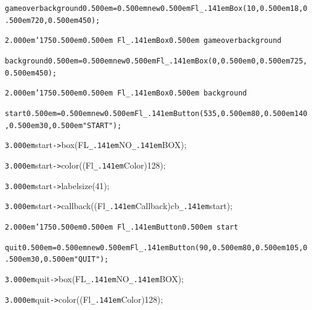 \documentclass[12pt]{article}
\begin{document}
\noindent
\tt{}gameoverbackground{\tt\mc \kern0.500em}={\tt\mc \kern0.500em}new{\tt\mc \kern0.500em}Fl{\tt\_\kern.141em}Box(10,{\tt\mc \kern0.500em}18,{\tt\mc \kern0.500em}720,{\tt\mc \kern0.500em}450);

\noindent
{}{\tt\mc \kern2.000em}{\tt\char'175}{\tt\mc \kern0.500em}\tt\mc {\tt /}{\tt /}\kern0.500em Fl{\tt\_\kern.141em}Box{\tt *}\kern0.500em gameoverbackground

\noindent
\tt{}background{\tt\mc \kern0.500em}={\tt\mc \kern0.500em}new{\tt\mc \kern0.500em}Fl{\tt\_\kern.141em}Box(0,{\tt\mc \kern0.500em}0,{\tt\mc \kern0.500em}725,{\tt\mc \kern0.500em}450);

\noindent
{}{\tt\mc \kern2.000em}{\tt\char'175}{\tt\mc \kern0.500em}\tt\mc {\tt /}{\tt /}\kern0.500em Fl{\tt\_\kern.141em}Box{\tt *}\kern0.500em background

\noindent
\tt{}start{\tt\mc \kern0.500em}={\tt\mc \kern0.500em}new{\tt\mc \kern0.500em}Fl{\tt\_\kern.141em}Button(535,{\tt\mc \kern0.500em}80,{\tt\mc \kern0.500em}140,{\tt\mc \kern0.500em}30,{\tt\mc \kern0.500em}{\tt "}START{\tt "});

\noindent
{}{\tt\mc \kern3.000em}start{\tt -}{\tt >}box(FL{\tt\_\kern.141em}NO{\tt\_\kern.141em}BOX);

\noindent
{}{\tt\mc \kern3.000em}start{\tt -}{\tt >}color((Fl{\tt\_\kern.141em}Color)128);

\noindent
{}{\tt\mc \kern3.000em}start{\tt -}{\tt >}labelsize(41);

\noindent
{}{\tt\mc \kern3.000em}start{\tt -}{\tt >}callback((Fl{\tt\_\kern.141em}Callback{\tt *})cb{\tt\_\kern.141em}start);

\noindent
{}{\tt\mc \kern2.000em}{\tt\char'175}{\tt\mc \kern0.500em}\tt\mc {\tt /}{\tt /}\kern0.500em Fl{\tt\_\kern.141em}Button{\tt *}\kern0.500em start

\noindent
\tt{}quit{\tt\mc \kern0.500em}={\tt\mc \kern0.500em}new{\tt\mc \kern0.500em}Fl{\tt\_\kern.141em}Button(90,{\tt\mc \kern0.500em}80,{\tt\mc \kern0.500em}105,{\tt\mc \kern0.500em}30,{\tt\mc \kern0.500em}{\tt "}QUIT{\tt "});

\noindent
{}{\tt\mc \kern3.000em}quit{\tt -}{\tt >}box(FL{\tt\_\kern.141em}NO{\tt\_\kern.141em}BOX);

\noindent
{}{\tt\mc \kern3.000em}quit{\tt -}{\tt >}color((Fl{\tt\_\kern.141em}Color)128);
\end{document}
